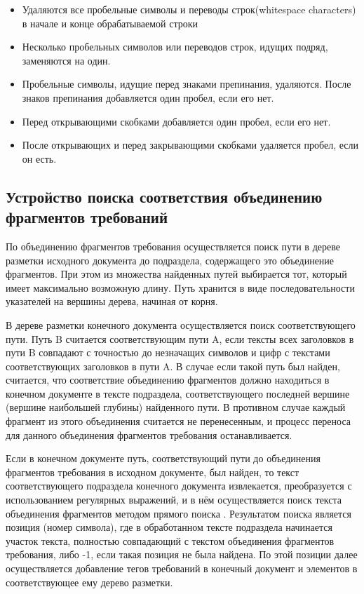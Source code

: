 \begin{enumerate}
\begin{itemize}
\item Удаляются все пробельные символы и переводы строк(whitespace characters) в начале и конце обрабатываемой строки

\item Несколько пробельных символов или переводов строк, идущих подряд, заменяются на один.

\item Пробельные символы, идущие перед знаками препинания, удаляются. После знаков препинания добавляется один пробел, если его нет.

\item Перед открывающими скобками добавляется один пробел, если его нет.

\item После открывающих и перед закрывающими скобками удаляется пробел, если он есть.
\end{itemize}

\end{enumerate}

\subsection{Устройство поиска соответствия объединению фрагментов требований}

По объединению фрагментов требования осуществляется поиск пути в дереве разметки исходного документа до подраздела, содержащего это объединение фрагментов. При этом из множества найденных путей выбирается тот, который имеет максимально возможную длину. Путь хранится в виде последовательности указателей на вершины дерева, начиная от корня. 

В дереве разметки конечного документа осуществляется поиск соответствующего пути. Путь B считается соответствующим пути A, если тексты всех заголовков в пути B совпадают с точностью до незначащих символов и цифр с текстами соответствующих заголовков в пути A. В случае если такой путь был найден, считается, что соответствие объединению фрагментов должно находиться в конечном документе в тексте подраздела, соответствующего последней вершине (вершине наибольшей глубины) найденного пути. В противном случае каждый фрагмент из этого объединения считается не перенесенным, и процесс переноса для данного объединения фрагментов требования останавливается.

Если в конечном документе путь, соответствующий пути до объединения фрагментов требования в исходном документе, был найден, то текст соответствующего подраздела конечного документа извлекается, преобразуется с использованием регулярных выражений, и в нём осуществляется поиск текста объединения фрагментов методом прямого поиска \cite{web:StrSearch}. Результатом поиска является позиция (номер символа), где в обработанном тексте подраздела начинается участок текста, полностью совпадающий с текстом объединения фрагментов требования, либо -1, если такая позиция не была найдена. По этой позиции далее осуществляется добавление тегов требований в конечный документ и элементов в соответствующее ему дерево разметки.

